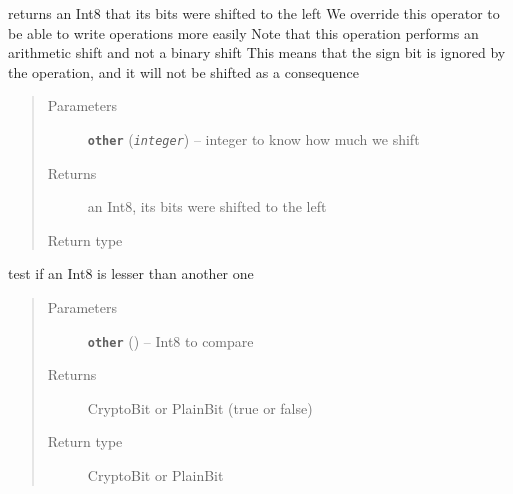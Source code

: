 \documentclass[letterpaper,10pt,english]{sphinxmanual}
\begin{document}
\begin{fulllineitems}
\begin{fulllineitems}
\label{datatypes.integers:datatypes.integers.Int8.Int8.__lshift__}
returns an Int8 that its bits were shifted to the left
We override this operator to be able to write operations more easily
Note that this operation performs an arithmetic shift and not a binary shift
This means that the sign bit is ignored by the operation, and it will not be shifted as a consequence
\begin{quote}\begin{description}
\item[{Parameters}] \leavevmode
\textbf{\texttt{other}} (\emph{\texttt{integer}}) -- integer to know how much we shift

\item[{Returns}] \leavevmode
an Int8, its bits were shifted to the left

\item[{Return type}] \leavevmode
{\hyperref[datatypes.integers:datatypes.integers.Int8.Int8]{}}

\end{description}\end{quote}

\end{fulllineitems}


\begin{fulllineitems}
\label{datatypes.integers:datatypes.integers.Int8.Int8.__lt__}
test if an Int8 is lesser than another one
\begin{quote}\begin{description}
\item[{Parameters}] \leavevmode
\textbf{\texttt{other}} ({\hyperref[datatypes.integers:datatypes.integers.Int8.Int8]{}}) -- Int8 to compare

\item[{Returns}] \leavevmode
CryptoBit or PlainBit (true or false)

\item[{Return type}] \leavevmode
CryptoBit or PlainBit

\end{description}\end{quote}

\end{fulllineitems}


\end{fulllineitems}
\end{document}
